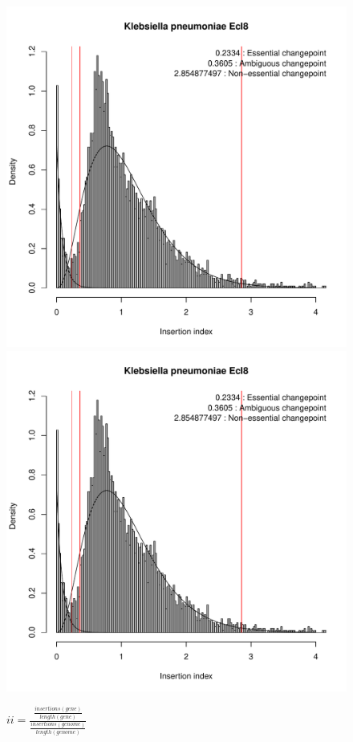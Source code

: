 \documentclass[a4paper,10pt]{article}
\begin{document}
\begin{figure}
\includegraphics[scale=0.2, page=11]{mixtools.pdf}
\includegraphics[scale=0.2, page=12]{mixtools.pdf}
\caption{$ii=\frac{\frac{insertions(gene)}{length(gene)}}{\frac{insertions(genome)}{length(genome)}}$\newline
}
\end{figure}
\end{document}
